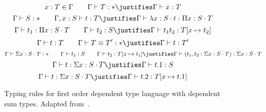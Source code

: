 \begin{figure}
    \begin{proofrules}
        \[ x : T \in \context{\Gamma} \qquad \Gamma \vdash T : *
        \justifies
        \context{\Gamma} \vdash x : T 
        \]
        \[ \Gamma \vdash S : * \qquad \Gamma, x : S \vdash t : T 
        \justifies 
        \Gamma \vdash \lambda x : S \cdot t : \Pi x : S \cdot T 
        \]
        \[ \Gamma \vdash t_1 : \Pi x : S \cdot T \qquad \Gamma \vdash t_2 : S 
        \justifies 
        \Gamma \vdash t_1 t_2 : T[x \mapsto t_2] 
        \]
        \[ \Gamma \vdash t : T \qquad \Gamma \vdash T \equiv T^\prime : * 
        \justifies 
        \Gamma \vdash t : T^\prime 
        \]
        \[ \Gamma \vdash \Sigma x : S \cdot T : * \qquad 
            \Gamma \vdash t_1 : S \qquad  \Gamma \vdash t_2 : T[x \mapsto t_1] 
        \justifies 
        \Gamma \vdash (t_1, t_2 : \Sigma x : S \cdot T) : \Sigma x : S \cdot T 
        \] 
        \[ \Gamma \vdash t : \Sigma x : S \cdot T 
        \justifies 
        \Gamma \vdash t.1 : S 
        \]
        \[ \Gamma \vdash t : \Sigma x : S \cdot T 
        \justifies 
        \Gamma \vdash t.2 : T[x \mapsto t.1] 
        \]
    \end{proofrules}
\caption{Typing rules for first order dependent type language with dependent sum types. Adapted from~\cite{pierce2005advanced}.}
\label{fig:dtt-w-sigma}
\end{figure}